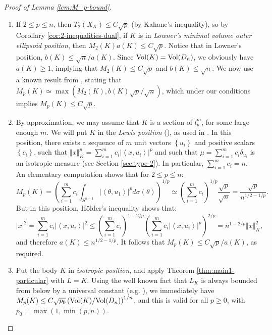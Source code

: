 \documentclass[12pt,oneside]{amsart}
\theoremstyle{definition}
\theoremstyle{remark}
\theoremstyle{proof}
\numberwithin{equation}{section}
\newcommand{\norm}[1]{\left\Vert#1\right\Vert}
\newcommand{\abs}[1]{\left\vert#1\right\vert}
\newcommand{\set}[1]{\left\{#1\right\}}
\newcommand{\brac}[1]{\left(#1\right)}
\newcommand{\scalar}[1]{\left \langle #1 \right \rangle}
\newcommand{\Vol}[1]{\textnormal{Vol} (#1)}
\newcommand{\sVolRatio}[2]{\brac{\Vol{#1}/\Vol{#2}}^{1/n}}
\begin{document}
\begin{proof}[Proof of Lemma \ref{lem:M_p-bound}]
\begin{enumerate}
\item
If $2 \leq p \leq n$, then $T_2(X_K) \leq C \sqrt{p}$ (by Kahane's
inequality), so by Corollary \ref{cor:2-inequalities-dual}, if
$K$ is in \emph{Lowner's minimal volume outer ellipsoid position},
then $M_2(K) a(K) \leq C \sqrt{p}$. Notice that in Lowner's
position, $b(K) \leq \sqrt{n} / a(K)$. Since $\Vol{K} =
\Vol{D_n}$, we obviously have $a(K) \geq 1$, implying that
$M_2(K) \leq C \sqrt{p}$ and $b(K) \leq \sqrt{n}$. We now use a
known result from \cite{LMS}, stating that $M_p(K) \simeq
\max(M_2(K),b(K)\sqrt{p}/\sqrt{n})$, which under our conditions
implies $M_p(K) \leq C \sqrt{p}$.
\item
By approximation, we may assume that $K$ is a section of $l_p^m$,
for some large enough $m$. We will put $K$ in the \emph{Lewis
position} (\cite{Lewis-Position}), as used in
\cite{Ball-Volume-Ratios}. In this position, there exists a
sequence of $m$ unit vectors $\set{u_i}$ and positive scalars
$\set{c_i}$, such that $\norm{x}^p_K = \sum_{i=1}^m c_i
\abs{\scalar{x,u_i}}^p$ and such that $\mu = \sum_{i=1}^m c_i
\delta_{u_i}$ is an isotropic measure (see Section
\ref{sec:type-2}). In particular, $\sum_{i=1}^m c_i = n$. An
elementary computation shows that for $2\leq p \leq n$:
\[
M_p(K) = \brac{\sum_{i=1}^m c_i \int_{S^{n-1}}
\abs{\scalar{\theta,u_1}}^p d\sigma(\theta)}^{1/p}  \simeq
\brac{\sum_{i=1}^m c_i}^{1/p} \frac{\sqrt{p}}{\sqrt{n}} =
\frac{\sqrt{p}}{n^{1/2 - 1/p}}.
\]
But in this position, H\"{o}lder's inequality shows that:
\[
\abs{x}^2 = \sum_{i=1}^m c_i \abs{\scalar{x,u_i}}^2 \leq
\brac{\sum_{i=1}^m c_i}^{1-2/p} \brac{\sum_{i=1}^m c_i
\abs{\scalar{x,u_i}}^p}^{2/p} = n^{1-2/p} \norm{x}^2_K,
\]
and therefore $a(K) \leq n^{1/2 - 1/p}$. It follows that $M_p(K)
\leq C \sqrt{p} / a(K)$, as required.
\item
Put the body $K$ in \emph{isotropic position}, and apply Theorem
\ref{thm:main1-particular} with $L=K$. Using the well known fact
that $L_K$ is always bounded from below by a universal constant
(e.g. \cite{Milman-Pajor-LK}), we immediately have $M_p(K) \leq C
\sqrt{p_0} \sVolRatio{K}{D_n}$, and this is valid for all $p \geq
0$, with $p_0 = \max(1,\min(p,n))$.
\end{enumerate}


\end{proof}
\end{document}

